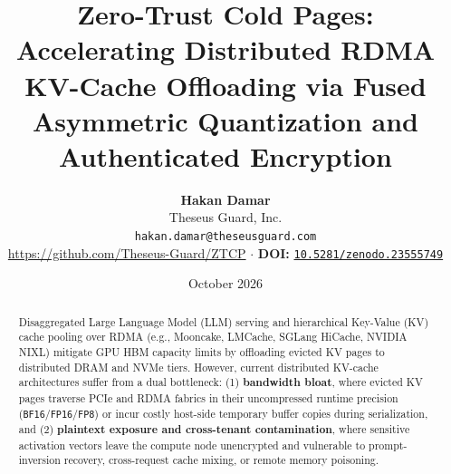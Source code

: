 \documentclass[10pt,twocolumn]{article}
\title{\Large \textbf{Zero-Trust Cold Pages: Accelerating Distributed RDMA KV-Cache Offloading via Fused Asymmetric Quantization and Authenticated Encryption}}
\author{
    \textbf{Hakan Damar} \\
    Theseus Guard, Inc. \\
    \texttt{hakan.damar@theseusguard.com} \\
    \small\url{https://github.com/Theseus-Guard/ZTCP} $\cdot$ \textbf{DOI:} \href{https://doi.org/10.5281/zenodo.23555749}{\texttt{10.5281/zenodo.23555749}}
}
\date{October 2026}
\begin{document}
\maketitle

\begin{abstract}
Disaggregated Large Language Model (LLM) serving and hierarchical Key-Value (KV) cache pooling over RDMA (e.g., Mooncake, LMCache, SGLang HiCache, NVIDIA NIXL) mitigate GPU HBM capacity limits by offloading evicted KV pages to distributed DRAM and NVMe tiers. However, current distributed KV-cache architectures suffer from a dual bottleneck: (1) \textbf{bandwidth bloat}, where evicted KV pages traverse PCIe and RDMA fabrics in their uncompressed runtime precision (\texttt{BF16}/\texttt{FP16}/\texttt{FP8}) or incur costly host-side temporary buffer copies during serialization, and (2) \textbf{plaintext exposure and cross-tenant contamination}, where sensitive activation vectors leave the compute node unencrypted and vulnerable to prompt-inversion recovery, cross-request cache mixing, or remote memory poisoning.


\end{abstract}
\end{document}
